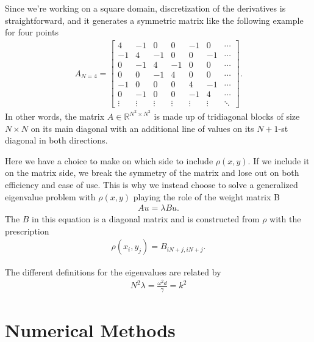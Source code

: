 \documentclass[10pt,a4paper,twocolumn]{article}
\begin{document}
Since we're working on a square domain, discretization of the derivatives is straightforward, and it generates a symmetric matrix like the following example for four points
%
\begin{align}
    A_{N=4}=\begin{bmatrix}
        4 & -1 & 0 & 0 & -1 & 0 & \cdots\\
        -1 & 4 & -1 & 0 & 0 & -1 & \cdots\\
        0 & -1 & 4 & -1 & 0 & 0 & \cdots\\
        0 & 0 & -1 & 4 & 0 & 0 & \cdots\\
        -1 & 0 & 0 & 0 & 4 & -1 & \cdots\\
        0 & -1 & 0 & 0 & -1 & 4 & \cdots\\
        \vdots & \vdots & \vdots & \vdots & \vdots & \vdots & \ddots
    \end{bmatrix}.
\end{align}
%
In other words, the matrix $A \in \mathbb{R}^{N^2 \times N^2}$ is made up of tridiagonal blocks of size $N \times N$ on its main diagonal with an additional line of values on its $N+1$-st diagonal in both directions.

Here we have a choice to make on which side to include $\rho(x,y)$. If we include it on the matrix side, we break the symmetry of the matrix and lose out on both efficiency and ease of use. This is why we instead choose to solve a generalized eigenvalue problem with $\rho(x,y)$ playing the role of the weight matrix B
%
\begin{align}
    A u = \lambda B u.
\end{align}
%
The $B$ in this equation is a diagonal matrix and is constructed from $\rho$ with the prescription
%
\begin{align}
    \rho(x_i, y_j) = B_{iN+j, iN+j}.
\end{align}

The different definitions for the eigenvalues are related by
%
\begin{align}
    N^2 \lambda = \frac{\omega^2 d}{\gamma} = k^2
\end{align}

\section{Numerical Methods}
\end{document}
